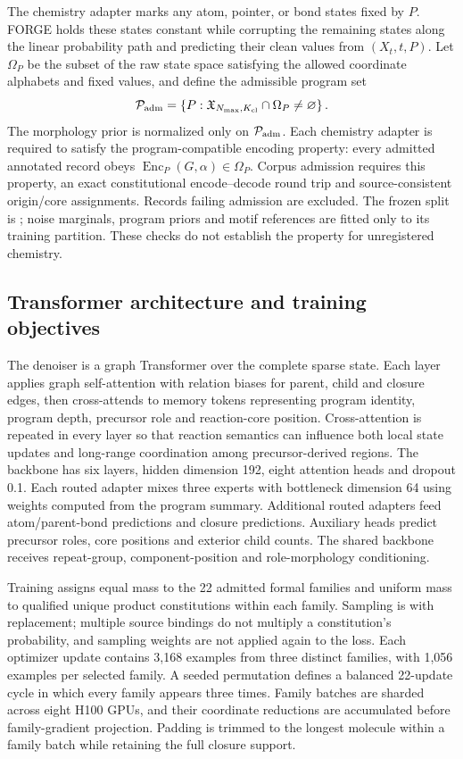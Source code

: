 The chemistry adapter marks any atom, pointer, or bond states fixed by $P$.
FORGE holds these states constant while corrupting the remaining states along the linear probability
path and predicting their clean values from $(X_t,t,P)$. Let $\Omega_P$ be the subset of the raw state
space satisfying the allowed coordinate alphabets and fixed values, and define the admissible program set
\begin{equation}
    \mathcal P_{\rm adm}
    =\left\{P:\mathfrak X_{N_{\max},K_{\rm cl}}\cap\Omega_P\neq\varnothing\right\}.
\end{equation}
The morphology prior is normalized only on $\mathcal P_{\rm adm}$. Each chemistry adapter is required
to satisfy the program-compatible encoding property: every admitted annotated record obeys
$\operatorname{Enc}_P(G,\alpha)\in\Omega_P$. Corpus admission requires this property, an exact
constitutional encode--decode round trip and source-consistent origin/core assignments. Records
failing admission are excluded. The frozen split is ; noise marginals,
program priors and motif references are fitted only to its training partition. These checks do not
establish the property for unregistered chemistry.

\subsection{Transformer architecture and training objectives}
\label{app:training}

The denoiser is a graph Transformer over the complete sparse state. Each layer applies graph
self-attention with relation biases for parent, child and closure edges, then cross-attends to memory
tokens representing program identity, program depth, precursor role and reaction-core position.
Cross-attention is repeated in every layer so that reaction semantics can influence both local state
updates and long-range coordination among precursor-derived regions. The backbone has six layers,
hidden dimension 192, eight attention heads and dropout 0.1. Each routed adapter mixes three
experts with bottleneck dimension 64 using weights computed from the program summary. Additional
routed adapters feed atom/parent-bond predictions and closure predictions. Auxiliary heads predict
precursor roles, core positions and exterior child counts. The shared backbone receives
repeat-group, component-position and role-morphology conditioning.

Training assigns equal mass to the 22 admitted formal families and uniform mass to qualified
unique product constitutions within each family. Sampling is with replacement; multiple source
bindings do not multiply a constitution's probability, and sampling weights are not applied again
to the loss. Each optimizer update contains 3,168 examples from three distinct families, with
1,056 examples per selected family. A seeded permutation defines a balanced 22-update cycle in
which every family appears three times. Family batches are sharded across eight H100 GPUs, and
their coordinate reductions are accumulated before family-gradient projection. Padding is trimmed
to the longest molecule within a family batch while retaining the full closure support.


